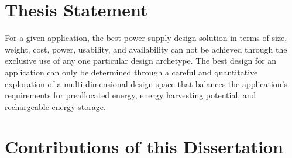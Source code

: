 \section{Thesis Statement}

%
%
%
%
%
%


For a given application, the best power supply design solution in terms of size, weight, cost, power, usability, and availability can not be achieved through the exclusive use of any one particular design archetype. The best design for an application can only be determined through a careful and quantitative exploration of a multi-dimensional design space that balances the application's requirements for preallocated energy, energy harvesting potential, and rechargeable energy storage. 

\the\textwidth

\section{Contributions of this Dissertation}


